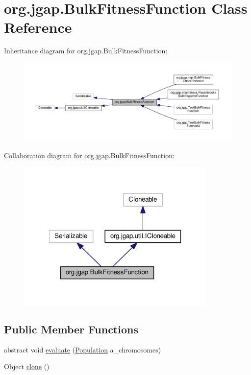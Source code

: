 \hypertarget{classorg_1_1jgap_1_1_bulk_fitness_function}{\section{org.\-jgap.\-Bulk\-Fitness\-Function Class Reference}
\label{classorg_1_1jgap_1_1_bulk_fitness_function}
}


Inheritance diagram for org.\-jgap.\-Bulk\-Fitness\-Function\-:
\nopagebreak
\begin{figure}[H]
\begin{center}
\leavevmode
\includegraphics[width=350pt]{classorg_1_1jgap_1_1_bulk_fitness_function__inherit__graph}
\end{center}
\end{figure}


Collaboration diagram for org.\-jgap.\-Bulk\-Fitness\-Function\-:
\nopagebreak
\begin{figure}[H]
\begin{center}
\leavevmode
\includegraphics[width=280pt]{classorg_1_1jgap_1_1_bulk_fitness_function__coll__graph}
\end{center}
\end{figure}
\subsection*{Public Member Functions}
\begin{DoxyCompactItemize}
\item 
abstract void \hyperlink{classorg_1_1jgap_1_1_bulk_fitness_function_a2685b837c809586e7a029e670bc1cd42}{evaluate} (\hyperlink{classorg_1_1jgap_1_1_population}{Population} a\-\_\-chromosomes)
\item 
Object \hyperlink{classorg_1_1jgap_1_1_bulk_fitness_function_a3789d9f9a8c4245f3f970c172241b1da}{clone} ()
\end{DoxyCompactItemize}
